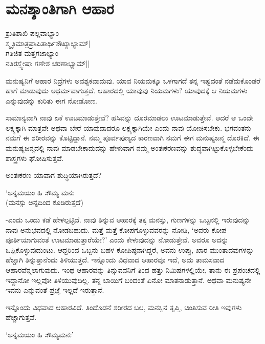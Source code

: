 \chapter{ಮನಶ್ಶಾಂತಿಗಾಗಿ ಆಹಾರ}

\begin{shloka}
ಶ್ರುತಿಶಾಖಿ ಪಲ್ಲವಾಭ್ಯಾಂ\\
ಸ್ಮೃತಿಮಾತ್ರಪ್ರಾಪಿತಾರ್ಥಿಸೌಖ್ಯಾಭ್ಯಾಮ್|\\
ಗತಿಜಿತ ಮತ್ತಗಜಾಭ್ಯಾಂ\\
ನತಿರಸ್ತ್ವೇಷಾ ಗಣೇಶ ಚರಣಾಭ್ಯಾಮ್||
\end{shloka}

ಮನುಷ್ಯನಿಗೆ ಆಹಾರ ನಿದ್ರೆಗಳು ಅವಶ್ಯಕವಾದುವು. ಯಾವ ನಿಯಮಕ್ಕೂ ಒಳಗಾಗದೆ ತನ್ನ ಇಷ್ಟದಂತೆ ನಡೆದುಕೊಂಡರೆ ಹಾಗೆ ಮಾಡುವುದು ಅಧರ್ಮವಾಗುತ್ತದೆ. ಆಹಾರದಲ್ಲಿ ಯಾವುವು ನಿಯಮಗಳು? ಯಾವುದಕ್ಕೆ ಆ ನಿಯಮಗಳು ಎನ್ನುವುದನ್ನು ಕುರಿತು ಈಗ ನೋಡೋಣ.

ಸಾಮಾನ್ಯವಾಗಿ ನಾವು ಏಕೆ ಊಟಮಾಡುತ್ತೇವೆ? ಹಸಿವನ್ನು ದೂರಮಾಡಲು ಊಟಮಾಡುತ್ತೇವೆ. ಆದರೆ ಆ ಒಂದೇ ಲಕ್ಷ್ಯಕ್ಕಾಗಿ ಮಾತ್ರವೇ ಅಥವಾ ಬೇರೆ ಯಾವುದಾದರೂ ಲಕ್ಷ್ಯಕ್ಕಾಗಿಯೇ ಎಂದು ನಾವು ಯೋಚಿಸಬೇಕು. ಭಗವಂತನು ನಮಗೆ ಈ ಶರೀರವನ್ನು ಕೊಟ್ಟಿದ್ದಾನೆ. ನಮ್ಮ ಪೂರ್ವಪುಣ್ಯದ ಕಾರಣವಾಗಿ ನಮಗೆ ಈಗ ಮನುಷ್ಯಜನ್ಮ ದೊರಕಿದೆ. ಈ ಮನುಷ್ಯಜನ್ಮದಲ್ಲಿ ನಾವು ಮಾಡಬೇಕಾದುದನ್ನು ಹೇಳುವಾಗ ನಮ್ಮ ಅಂತಃಕರಣವನ್ನು ಶುದ್ಧವಾಗಿಟ್ಟುಕೊಳ್ಳಬೇಕೆಂದು ಶಾಸ್ತ್ರಗಳು ಘೋಷಿಸುತ್ತವೆ.

ಅಂತಃಕರಣ ಯಾವಾಗ ಶುದ್ಧಿಯಾಗಿರುತ್ತದೆ?

\begin{shloka}
`ಅನ್ನಮಯಂ ಹಿ ಸೌಮ್ಯ ಮನಃ\\
(ಮನಸ್ಸು ಅನ್ನದಿಂದ ಕೂಡಿರುತ್ತದೆ)
\end{shloka}

-ಎಂದು ಒಂದು ಕಡೆ ಹೇಳಲ್ಪಟ್ಟಿದೆ. ನಾವು ತಿನ್ನುವ ಆಹಾರಕ್ಕೆ ತಕ್ಕ ಮನಸ್ಸು, ಗುಣಗಳನ್ನು ಒಬ್ಬನಲ್ಲಿ ಇರುವುದನ್ನು ನಾವು ಅನುಭವದಲ್ಲಿ ನೋಡಬಹುದು. ಮತ್ತೆ ಮತ್ತೆ ಕೋಪಗೊಳ್ಳುವವರನ್ನು ನೋಡಿ, `ಅವರು ಕೋಪ ಪೂರ್ತಿಯಾಗುವಂತೆ ಊಟಮಾಡುತ್ತಾರೆಯೇ?' ಎಂದು ಕೇಳುವುದನ್ನು ನೋಡುತ್ತೇವೆ. ಅವರೂ ಅದನ್ನು ಒಪ್ಪಿಕೊಳ್ಳುವುದುಂಟು. ಆದ್ದರಿಂದ ಒಬ್ಬನು ಬಹಳ ಕೋಪಿಷ್ಠನಾಗಿದ್ದರೆ, ಅವನು ಉಪ್ಪು, ಖಾರ ಮುಂತಾದವುಗಳನ್ನು ಹೆಚ್ಚಾಗಿ ತಿನ್ನುತ್ತಾನೆಂದು ತಿಳಿಯುತ್ತದೆ. ಇನ್ನೊಂದು ವಿಧವಾದ ಆಹಾರವೂ ಇದೆ, ಅದು ತಾಮಸವಾದ ಆಹಾರವೆನ್ನಲಾಗುವುದು. ಇಂಥ ಆಹಾರವನ್ನು ತಿನ್ನುವವನಿಗೆ ತಿಂದ ಹತ್ತು ನಿಮಿಷಗಳಲ್ಲಿಯೇ, ತಾನು ಈ ಪ್ರಪಂಚದಲ್ಲಿ ಇದ್ದಾನೋ ಇಲ್ಲವೋ ತಿಳಿಯುವುದಿಲ್ಲ. ತನ್ನ ಬಾಯಿಗೆ ಬಂದಂತೆ ಏನೋ ಮಾತನಾಡುತ್ತಾನೆ. ಅಥವಾ ಮನುಷ್ಯನೇ ಇವನು ಎನ್ನುವಂತೆ ಪ್ರಜ್ಞೆ ಇಲ್ಲದೆ ಇರುತ್ತಾನೆ.

ಇನ್ನೊಂದು ವಿಧವಾದ ಆಹಾರವಿದೆ. ತಿಂದೊಡನೆ ಶರೀರದ ಬಲ, ಮನಸ್ಸಿನ ತೃಪ್ತಿ, ಚಿಂತಿಸುವ ರೀತಿ ಇವುಗಳು ಹೆಚ್ಚಾಗುತ್ತವೆ.

\begin{shloka}
`ಅನ್ನಮಯಂ ಹಿ ಸೌಮ್ಯಮನಃ'
\end{shloka}

